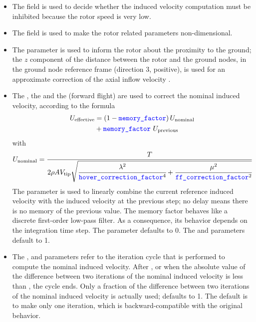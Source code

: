 \begin{itemize}
\item
The  field is used to decide whether
the induced velocity computation must be inhibited because the rotor speed
is very low.

\item
The  field is used to make the rotor related parameters
non-dimensional.

\item
The  parameter is used to inform the rotor about the proximity
to the ground; the $z$ component of the distance between the rotor
and the ground nodes, in the ground node reference frame
(direction 3, positive),
is used for an approximate correction of the axial inflow velocity
\cite{NASA-TR-3021}.

\item
The , the  
and the  (forward flight) are
used to correct the nominal induced velocity, according to the formula
\begin{align*}
	U_{\text{effective}}
	&=
	\left( 1 - \textcolor{blue}{\texttt{memory\_factor}} \right) U_{\text{nominal}}
	\\
	&+ \textcolor{blue}{\texttt{memory\_factor}} \ U_{\text{previous}}
\end{align*}
with
\begin{align*}
	U_{\text{nominal}}
	&=
	\frac{T}{2 \rho A V_{\text{tip}} \sqrt{
		\cfrac{\lambda^2}{\textcolor{blue}{\texttt{hover\_correction\_factor}}^4}
		+ \cfrac{\mu^2}{\textcolor{blue}{\texttt{ff\_correction\_factor}}^2}
	}}
\end{align*}
The  parameter is used to linearly combine the current
reference induced velocity with the induced velocity at the previous step;
no delay means there is no memory of the previous value.
The memory factor behaves like a discrete first-order low-pass filter.
As a consequence, its behavior depends on the integration time step.
The  parameter defaults to 0.
The  
and  parameters default to 1.

\item
The ,  
and  parameters refer to the iteration cycle 
that is performed to compute the nominal induced velocity.
After , or when the absolute value 
of the difference between two iterations of the nominal induced 
velocity is less than , the cycle ends.
Only a fraction  of the difference between two
iterations of the nominal induced velocity is actually
used;  defaults to 1.
The default is to make only one iteration, which is backward-compatible
with the original behavior.
\end{itemize}

